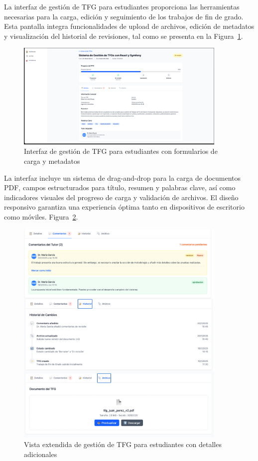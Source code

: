 \documentclass[12pt,a4paper,oneside]{report}
\begin{document}
La interfaz de gestión de TFG para estudiantes proporciona las herramientas necesarias para la carga, edición y seguimiento de los trabajos de fin de grado. Esta pantalla integra funcionalidades de upload de archivos, edición de metadatos y visualización del historial de revisiones, tal como se presenta en la Figura~\ref{fig:gestion-tfg-estudiante}.

\begin{figure}[H]
\centering
\includegraphics[width=0.9\textwidth]{processed/images/gestion_tfg_estudiante.png}
\caption{Interfaz de gestión de TFG para estudiantes con formularios de carga y metadatos}
\label{fig:gestion-tfg-estudiante}
\end{figure}

La interfaz incluye un sistema de drag-and-drop para la carga de documentos PDF, campos estructurados para título, resumen y palabras clave, así como indicadores visuales del progreso de carga y validación de archivos. El diseño responsivo garantiza una experiencia óptima tanto en dispositivos de escritorio como móviles. Figura~\ref{fig:tfg-estudiante-extendido}.

\begin{figure}[H]
\centering
\includegraphics[width=0.9\textwidth]{processed/images/tfg-estudiante-extendido.png}
\caption{Vista extendida de gestión de TFG para estudiantes con detalles adicionales}
\label{fig:tfg-estudiante-extendido}
\end{figure}
\end{document}
